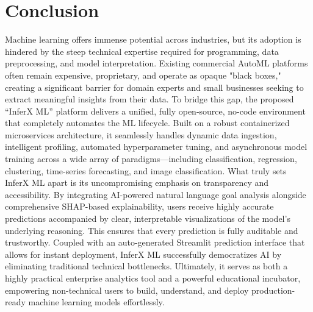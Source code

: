\chapter{Conclusion}
\vspace{-1cm}

\hspace{0.5cm}Machine learning offers immense potential across industries, but its adoption is hindered by the steep technical expertise required for programming, data preprocessing, and model interpretation. Existing commercial AutoML platforms often remain expensive, proprietary, and operate as opaque "black boxes," creating a significant barrier for domain experts and small businesses seeking to extract meaningful insights from their data. To bridge this gap, the proposed ``InferX ML'' platform delivers a unified, fully open-source, no-code environment that completely automates the ML lifecycle. Built on a robust containerized microservices architecture, it seamlessly handles dynamic data ingestion, intelligent profiling, automated hyperparameter tuning, and asynchronous model training across a wide array of paradigms—including classification, regression, clustering, time-series forecasting, and image classification. What truly sets InferX ML apart is its uncompromising emphasis on transparency and accessibility. By integrating AI-powered natural language goal analysis alongside comprehensive SHAP-based explainability, users receive highly accurate predictions accompanied by clear, interpretable visualizations of the model's underlying reasoning. This ensures that every prediction is fully auditable and trustworthy. Coupled with an auto-generated Streamlit prediction interface that allows for instant deployment, InferX ML successfully democratizes AI by eliminating traditional technical bottlenecks. Ultimately, it serves as both a highly practical enterprise analytics tool and a powerful educational incubator, empowering non-technical users to build, understand, and deploy production-ready machine learning models effortlessly.